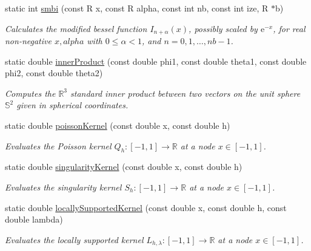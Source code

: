 \begin{DoxyCompactItemize}
\item 
static int \hyperlink{group__applications__fastsumS2__test_ga1d5bd4e21dc8f7d7c31cb53a2fe79915}{smbi} (const R x, const R alpha, const int nb, const int ize, R $\ast$b)
\begin{DoxyCompactList}\small\item\em Calculates the modified bessel function $I_{n+\alpha}(x)$, possibly scaled by $\mathrm{e}^{-x}$, for real non-\/negative $x,alpha$ with $0 \le \alpha < 1$, and $n=0,1,\ldots,nb-1$. \end{DoxyCompactList}\item 
static double \hyperlink{group__applications__fastsumS2__test_ga764f956ac40df99e776155bfa8da2e93}{inner\-Product} (const double phi1, const double theta1, const double phi2, const double theta2)
\begin{DoxyCompactList}\small\item\em Computes the $\mathbb{R}^3$ standard inner product between two vectors on the unit sphere $\mathbb{S}^2$ given in spherical coordinates. \end{DoxyCompactList}\item 
static double \hyperlink{group__applications__fastsumS2__test_ga6db9bf5c4ee6ca573d6d08a8202a5314}{poisson\-Kernel} (const double x, const double h)
\begin{DoxyCompactList}\small\item\em Evaluates the Poisson kernel $Q_h: [-1,1] \rightarrow \mathbb{R}$ at a node $x \in [-1,1]$. \end{DoxyCompactList}\item 
static double \hyperlink{group__applications__fastsumS2__test_ga3f82140c739f6fcf9bc17a03a09f580d}{singularity\-Kernel} (const double x, const double h)
\begin{DoxyCompactList}\small\item\em Evaluates the singularity kernel $S_h: [-1,1] \rightarrow \mathbb{R}$ at a node $x \in [-1,1]$. \end{DoxyCompactList}\item 
static double \hyperlink{group__applications__fastsumS2__test_ga226aec741614e0a2d2a9305bc2c28063}{locally\-Supported\-Kernel} (const double x, const double h, const double lambda)
\begin{DoxyCompactList}\small\item\em Evaluates the locally supported kernel $L_{h,\lambda}: [-1,1] \rightarrow \mathbb{R}$ at a node $x \in [-1,1]$. \end{DoxyCompactList}\item 

\end{DoxyCompactItemize}
